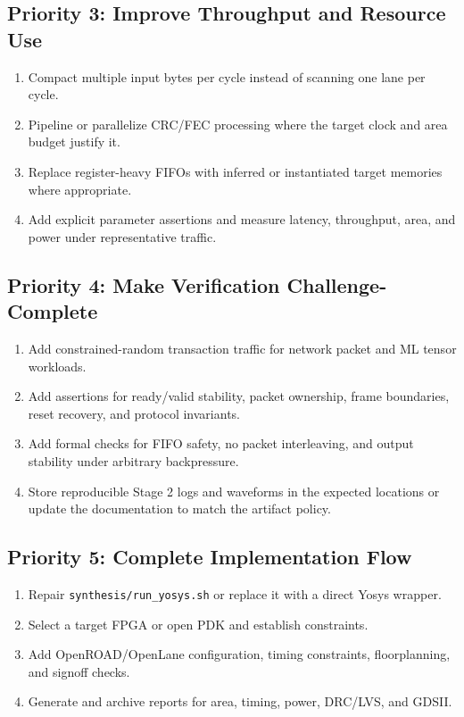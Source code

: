 \documentclass[11pt,a4paper]{article}
\newcommand{\code}[1]{\texttt{#1}}
\begin{document}
\subsection{Priority 3: Improve Throughput and Resource Use}
\begin{enumerate}[leftmargin=*]
    \item Compact multiple input bytes per cycle instead of scanning one lane per cycle.
    \item Pipeline or parallelize CRC/FEC processing where the target clock and area budget justify it.
    \item Replace register-heavy FIFOs with inferred or instantiated target memories where appropriate.
    \item Add explicit parameter assertions and measure latency, throughput, area, and power under representative traffic.
\end{enumerate}

\subsection{Priority 4: Make Verification Challenge-Complete}
\begin{enumerate}[leftmargin=*]
    \item Add constrained-random transaction traffic for network packet and ML tensor workloads.
    \item Add assertions for ready/valid stability, packet ownership, frame boundaries, reset recovery, and protocol invariants.
    \item Add formal checks for FIFO safety, no packet interleaving, and output stability under arbitrary backpressure.
    \item Store reproducible Stage 2 logs and waveforms in the expected locations or update the documentation to match the artifact policy.
\end{enumerate}

\subsection{Priority 5: Complete Implementation Flow}
\begin{enumerate}[leftmargin=*]
    \item Repair \code{synthesis/run\_yosys.sh} or replace it with a direct Yosys wrapper.
    \item Select a target FPGA or open PDK and establish constraints.
    \item Add OpenROAD/OpenLane configuration, timing constraints, floorplanning, and signoff checks.
    \item Generate and archive reports for area, timing, power, DRC/LVS, and GDSII.
\end{enumerate}
\end{document}
